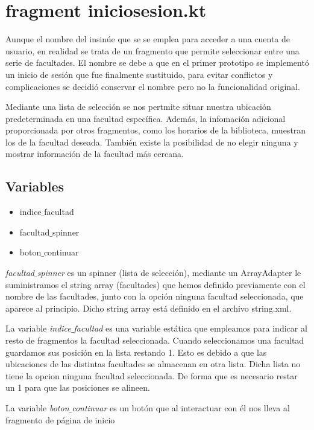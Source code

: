 \section{fragment iniciosesion.kt}
Aunque el nombre del insinúe que se se emplea para acceder a una cuenta de usuario, en realidad se trata de un fragmento que permite seleccionar entre una serie de facultades. El nombre se debe a que en el primer prototipo se implementó un inicio de sesión que fue finalmente sustituido, para evitar conflictos y complicaciones se decidió conservar el nombre pero no la funcionalidad original.

Mediante una lista de selección se nos pertmite situar nuestra ubicación predeterminada en una facultad específica. Además, la infomación adicional proporcionada por otros fragmentos, como los horarios de la biblioteca, muestran los de la facultad deseada. También existe la posibilidad de no elegir ninguna y mostrar información de la facultad más cercana.

\subsection{Variables}

\begin{itemize}
	\item indice$\_$facultad
	\item facultad$\_$spinner
	\item boton$\_$continuar
\end{itemize}

\textit{facultad$\_$spinner} es un spinner (lista de selección), mediante un ArrayAdapter le suministramos el string array (facultades) que hemos definido previamente con el nombre de las facultades, junto con la opción ninguna facultad seleccionada, que aparece al principio. Dicho string array está definido en el archivo string.xml.

La variable \textit{indice$\_$facultad} es una variable estática que empleamos para indicar al resto de fragmentos la facultad seleccionada. Cuando seleccionamos una facultad guardamos sus posición en la lista restando 1. Esto es debido a que las ubicaciones de las distintas facultades se almacenan en otra lista. Dicha lista no tiene la opcion ninguna facultad seleccionada. De forma que es necesario restar un 1 para que las posiciones se alineen.

La variable \textit{boton$\_$continuar} es un botón que al interactuar con él nos lleva al fragmento de página de inicio
